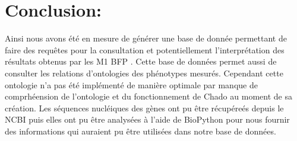 \documentclass[11pt,french,]{article}
\begin{document}
\hypertarget{conclusion}{%
\section{Conclusion:}\label{conclusion}}

Ainsi nous avons été en mesure de générer une base de donnée permettant
de faire des requêtes pour la consultation et potentiellement
l'interprétation des résultats obtenus par les M1 BFP . Cette base de
données permet aussi de consulter les relations d'ontologies des
phénotypes mesurés. Cependant cette ontologie n'a pas été implémenté de
manière optimale par manque de comprhéension de l'ontologie et du
fonctionnement de Chado au moment de sa création. Les séquences
nucléiques des gènes ont pu être récupéreés depuis le NCBI puis elles
ont pu être analysées à l'aide de BioPython pour nous fournir des
informations qui auraient pu être utilisées dans notre base de données.
\end{document}
